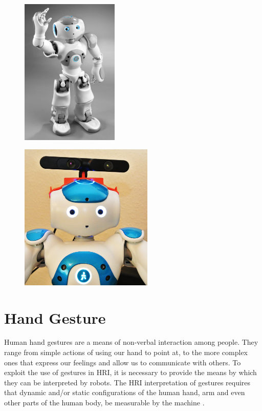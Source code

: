 \begin{figure}
	\centering
	\begin{minipage}{.5\textwidth}
		\centering
\includegraphics[height=7cm]{figures/nao.png} 
		\label{fig:nao}
	\end{minipage}%
	\begin{minipage}{.5\textwidth}
		\centering
\includegraphics[height=7cm]{figures/nao-xtion.png} 
		\label{fig:xtion}
	\end{minipage}
\end{figure}


\section{Hand Gesture} Human hand gestures are a means of non-verbal interaction among people. They range from simple actions of using our hand to point at, to the more complex ones that express our feelings and allow us to communicate with others. To exploit the use of gestures in HRI, it is necessary to provide the means by which they can be interpreted by robots. The HRI interpretation of gestures requires that dynamic and/or static configurations of the human hand, arm and even other parts of the human body, be measurable by the machine \cite{6}. 

